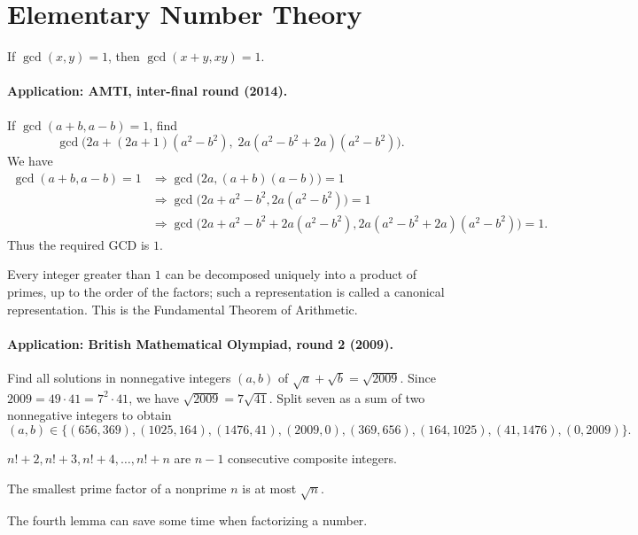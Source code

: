 \documentclass[11pt,a4paper]{article}
\begin{document}
\section*{Elementary Number Theory}
\setcounter{theorem}{0}\begin{lemma}
If $\gcd(x,y)=1$, then $\gcd(x+y,xy)=1$.
\end{lemma}
\paragraph{Application: AMTI, inter-final round (2014).}
If $\gcd(a+b,a-b)=1$, find
\[
\gcd\bigl(2a+(2a+1)(a^2-b^2),\;2a(a^2-b^2+2a)(a^2-b^2)\bigr).
\]
We have
\begin{align*}
\gcd(a+b,a-b)=1
&\Longrightarrow\gcd\bigl(2a,(a+b)(a-b)\bigr)=1\\
&\Longrightarrow\gcd\bigl(2a+a^2-b^2,2a(a^2-b^2)\bigr)=1\\
&\Longrightarrow\gcd\bigl(2a+a^2-b^2+2a(a^2-b^2),
 2a(a^2-b^2+2a)(a^2-b^2)\bigr)=1.
\end{align*}
Thus the required GCD is $1$.

\setcounter{theorem}{1}\begin{lemma}
Every integer greater than $1$ can be decomposed uniquely into a product of primes, up to the order of the factors; such a representation is called a canonical representation. This is the Fundamental Theorem of Arithmetic.
\end{lemma}
\paragraph{Application: British Mathematical Olympiad, round 2 (2009).}
Find all solutions in nonnegative integers $(a,b)$ of
$\sqrt a+\sqrt b=\sqrt{2009}$.
Since $2009=49\cdot41=7^2\cdot41$, we have $\sqrt{2009}=7\sqrt{41}$.
Split seven as a sum of two nonnegative integers to obtain
\[
(a,b)\in\{(656,369),(1025,164),(1476,41),(2009,0),
(369,656),(164,1025),(41,1476),(0,2009)\}.
\]


\setcounter{theorem}{2}\begin{lemma}
$n!+2,n!+3,n!+4,\ldots,n!+n$ are $n-1$ consecutive composite integers.
\end{lemma}
\setcounter{theorem}{3}\begin{lemma}
The smallest prime factor of a nonprime $n$ is at most $\sqrt n$.
\end{lemma}
The fourth lemma can save some time when factorizing a number.
\end{document}
